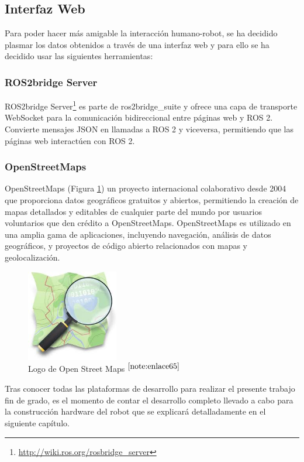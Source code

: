 \setcounter{footnote}{63} %


\subsection{Interfaz Web}

Para poder hacer más amigable la interacción humano-robot, se ha decidido plasmar los datos obtenidos a través de una interfaz web y para ello se ha decidido usar las siguientes herramientas: 
 
\subsubsection{ROS2bridge Server}

ROS2bridge Server\footnote{\url{http://wiki.ros.org/rosbridge_server}} es parte de ros2bridge\_suite y ofrece una capa de transporte WebSocket para la comunicación bidireccional entre páginas web y \acs{ROS} 2. Convierte mensajes JSON en llamadas a \acs{ROS} 2 y viceversa, permitiendo que las páginas web interactúen con \acs{ROS} 2. 

\subsubsection{OpenStreetMaps}

OpenStreetMaps (Figura \ref{fig:osm}) un proyecto internacional colaborativo desde 2004 que proporciona datos geográficos gratuitos y abiertos, permitiendo la creación de mapas detallados y editables de cualquier parte del mundo por usuarios voluntarios que den crédito a OpenStreetMaps. OpenStreetMaps es utilizado en una amplia gama de aplicaciones, incluyendo navegación, análisis de datos geográficos, y proyectos de código abierto relacionados con mapas y geolocalización.


\begin{figure} [h!]
	\begin{center}
		\includegraphics[width=4cm]{figs/osm.png}
	\end{center}
	\caption{Logo de Open Street Maps $^{\ref{note:enlace65}}$} 
	\label{fig:osm}
\end{figure}

\setcounter{footnote}{65} %

Tras conocer todas las plataformas de desarrollo para realizar el presente trabajo fin de grado, es el momento de contar el desarrollo completo llevado a cabo para la construcción hardware del robot que se explicará detalladamente en el siguiente capítulo.
